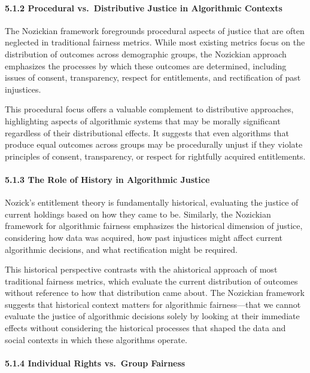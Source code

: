 \paragraph{5.1.2 Procedural vs.~Distributive Justice in Algorithmic
Contexts}\label{procedural-vs.-distributive-justice-in-algorithmic-contexts}

The Nozickian framework foregrounds procedural aspects of justice that
are often neglected in traditional fairness metrics. While most existing
metrics focus on the distribution of outcomes across demographic groups,
the Nozickian approach emphasizes the processes by which these outcomes
are determined, including issues of consent, transparency, respect for
entitlements, and rectification of past injustices.

This procedural focus offers a valuable complement to distributive
approaches, highlighting aspects of algorithmic systems that may be
morally significant regardless of their distributional effects. It
suggests that even algorithms that produce equal outcomes across groups
may be procedurally unjust if they violate principles of consent,
transparency, or respect for rightfully acquired entitlements.

\paragraph{5.1.3 The Role of History in Algorithmic
Justice}\label{the-role-of-history-in-algorithmic-justice}

Nozick's entitlement theory is fundamentally historical, evaluating the
justice of current holdings based on how they came to be. Similarly, the
Nozickian framework for algorithmic fairness emphasizes the historical
dimension of justice, considering how data was acquired, how past
injustices might affect current algorithmic decisions, and what
rectification might be required.

This historical perspective contrasts with the ahistorical approach of
most traditional fairness metrics, which evaluate the current
distribution of outcomes without reference to how that distribution came
about. The Nozickian framework suggests that historical context matters
for algorithmic fairness---that we cannot evaluate the justice of
algorithmic decisions solely by looking at their immediate effects
without considering the historical processes that shaped the data and
social contexts in which these algorithms operate.

\paragraph{5.1.4 Individual Rights vs.~Group
Fairness}\label{individual-rights-vs.-group-fairness}

